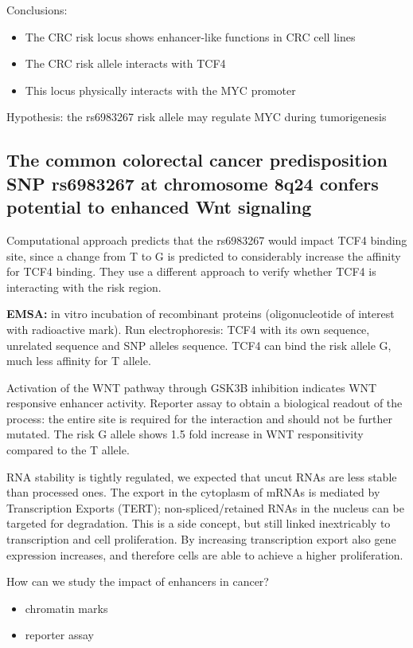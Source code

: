 Conclusions:

\begin{itemize}
\tightlist
\item
  The CRC risk locus shows enhancer-like functions in CRC cell lines
\item
  The CRC risk allele interacts with TCF4
\item
  This locus physically interacts with the MYC promoter
\end{itemize}

Hypothesis: the rs6983267 risk allele may regulate MYC during tumorigenesis

\subsection{The common colorectal cancer predisposition SNP rs6983267 at chromosome 8q24 confers potential to enhanced Wnt signaling}

Computational approach predicts that the rs6983267 would impact TCF4 binding site, since a change from T to G is predicted to considerably increase the affinity for TCF4 binding. They use a different approach to verify whether TCF4 is interacting with the risk region.

\textbf{EMSA:} in vitro incubation of recombinant proteins (oligonucleotide of interest with radioactive mark). Run electrophoresis: TCF4 with its own sequence, unrelated sequence and SNP alleles sequence. TCF4 can bind the risk allele G, much less affinity for T allele.

Activation of the WNT pathway through GSK3B inhibition indicates WNT responsive enhancer activity. Reporter assay to obtain a biological readout of the process: the entire site is required for the interaction and should not be further mutated. The risk G allele shows 1.5 fold increase in WNT responsitivity compared to the T allele.

RNA stability is tightly regulated, we expected that uncut RNAs are less stable than processed ones. The export in the cytoplasm of mRNAs is mediated by Transcription Exports (TERT); non-spliced/retained RNAs in the nucleus can be targeted for degradation. This is a side concept, but still linked inextricably to transcription and cell proliferation. By increasing transcription export also gene expression increases, and therefore cells are able to achieve a higher proliferation.

How can we study the impact of enhancers in cancer?
\begin{itemize}
\tightlist
\item
  chromatin marks
\item
  reporter assay
\end{itemize}

